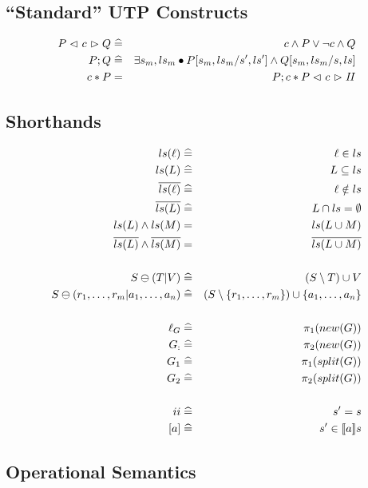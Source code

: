 \subsection{``Standard'' UTP Constructs}

\begin{eqnarray*}
   P \mathrel{\lhd ~ {c} ~ \rhd} Q
   &\mathrel{\widehat=}&
   c \land P \lor \lnot c \land Q
\\ P ; Q
   &\mathrel{\widehat=}&
   \exists s_m,ls_m \bullet P[s_m,ls_m/s',ls'] \land Q[s_m,ls_m/s,ls]
\\ c * P
   &=&
   P ; c * P \mathrel{\lhd ~ {c} ~ \rhd} \mathit{II}
\end{eqnarray*}

\subsection{Shorthands}

\begin{eqnarray*}
   ls(\ell) &\mathrel{\widehat=}& \ell \in ls
\\ ls(L) &\mathrel{\widehat=}& L \subseteq ls
\\ \overline{ls(\ell)} &\mathrel{\widehat=}& \ell \notin ls
\\ \overline{ls(L)} &\mathrel{\widehat=}& L \cap ls = \emptyset
\\ ls(L) \land ls(M) &=& ls(L \cup M)
\\ \overline{ls(L)} \land \overline{ls(M)} &=& \overline{ls(L \cup M)}
\\
\\ S \ominus (T|V)
   &\mathrel{\widehat=}& (S \setminus T) \cup V
\\ S \ominus (r_1,\dots,r_m|a_1,\dots,a_n)
   &\mathrel{\widehat=}& (S \setminus \{{r_1,\dots,r_m}\}) \cup \{{a_1,\dots,a_n}\}
\\
\\ \ell_G &\mathrel{\widehat=}& \pi_1 (new (G))
\\ G_: &\mathrel{\widehat=}& \pi_2 (new (G))
\\ G_1 &\mathrel{\widehat=}& \pi_1 (split(G))
\\ G_2 &\mathrel{\widehat=}& \pi_2 (split(G))
\\
\\ ii &\mathrel{\widehat=}& s'=s
\\ ~[a] &\mathrel{\widehat=}& s' \in [\![{a}]\!] s
\end{eqnarray*}

\subsection{Operational Semantics}

